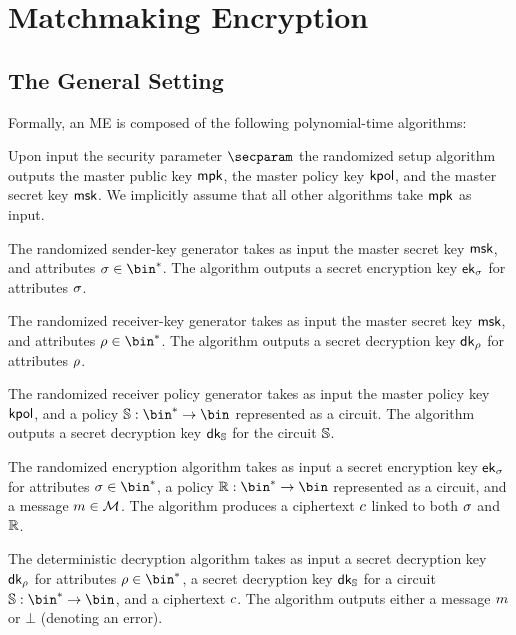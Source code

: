 \chapter{Matchmaking Encryption}

\section{The General Setting}
Formally, an ME is composed of the following polynomial-time algorithms:
\begin{description}\label{syntax:me}
    \item[$\setup(\secparam)$:] Upon input the security parameter $\secparam$ the randomized setup algorithm outputs the master public key $\mathsf{mpk}$, the master policy key $\mathsf{kpol}$, and the master secret key $\mathsf{msk}$.
          We implicitly assume that all other algorithms take $\mathsf{mpk}$ as input.
    \item[$\skgen(\msk, \sattr)$:] The randomized sender-key generator takes as input the master secret key $\mathsf{msk}$, and attributes $\sattr\in\bin^*$. The algorithm outputs a secret encryption key $\mathsf{ek}_{\sigma}$ for attributes $\sigma$.
    \item[$\rkgen(\msk, \rattr)$:] The randomized receiver-key generator takes as input the master secret key $\mathsf{msk}$, and attributes $\rattr\in\bin^*$. The algorithm outputs a secret decryption key $\mathsf{dk}_{\rho}$ for attributes $\rho$.
    \item[$\polgen(\kpol, \saccess)$:] The randomized receiver policy generator takes as input the master policy key $\mathsf{kpol}$, and a policy $\saccess:\allowbreak\bin^*\rightarrow\bin$ represented as a circuit. The algorithm outputs a secret decryption key $\mathsf{dk}_{\mathbb{S}}$ for the circuit $\mathbb{S}$.
    \item[$\enc(\ek_{\sattr}, \raccess, \msg)$:] The randomized encryption algorithm takes as input a secret encryption key $\mathsf{ek}_{\sigma}$ for attributes $\sattr \in \bin^*$, a policy $\raccess:\bin^*\rightarrow\bin$ represented as a circuit, and a message $m\in\mathcal{M}$. The algorithm produces a ciphertext $c$ linked to both $\sigma$ and $\mathbb{R}$.
    \item[$\dec(\dk_{\rattr}, \dk_{\saccess}, \cipher)$:] The deterministic decryption algorithm takes as input a secret decryption key $\mathsf{dk}_{\rho}$ for attributes $\rattr \in \bin^*$, a secret decryption key $\mathsf{dk}_{\mathbb{S}}$ for a circuit $\saccess:\bin^*\rightarrow\bin$, and a ciphertext $c$.
          The algorithm outputs either a message $m$ or  $\bot$ (denoting an error).
\end{description}

